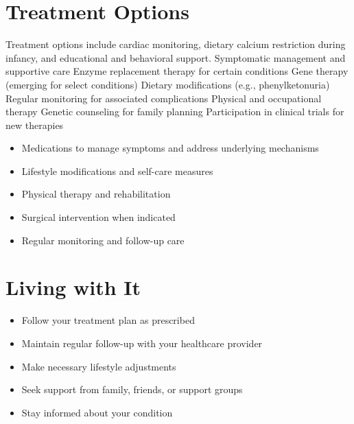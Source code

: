 \section{Treatment Options}
Treatment options include cardiac monitoring, dietary calcium restriction during infancy, and educational and behavioral support. Symptomatic management and supportive care Enzyme replacement therapy for certain conditions Gene therapy (emerging for select conditions) Dietary modifications (e.g., phenylketonuria) Regular monitoring for associated complications Physical and occupational therapy Genetic counseling for family planning Participation in clinical trials for new therapies

\begin{itemize}[noitemsep]
  \item Medications to manage symptoms and address underlying mechanisms
  \item Lifestyle modifications and self-care measures
  \item Physical therapy and rehabilitation
  \item Surgical intervention when indicated
  \item Regular monitoring and follow-up care
\end{itemize}
\section{Living with It}
\begin{itemize}[noitemsep]
  \item Follow your treatment plan as prescribed
  \item Maintain regular follow-up with your healthcare provider
  \item Make necessary lifestyle adjustments
  \item Seek support from family, friends, or support groups
  \item Stay informed about your condition
\end{itemize}
